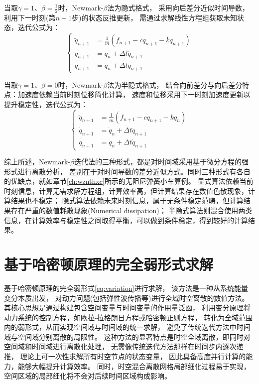 当取$\gamma=1$、$\beta=\frac{1}{2}$时，Newmark-$\beta$法为隐式格式，
采用向后差分近似时间导数，利用下一时刻(第$n+1$步)的状态反推更新，
需通过求解线性方程组获取未知状态，迭代公式为：
\begin{equation}\label{newmark-implicit}
    \left \{
        \begin{split}
            \ddot q_{n+1} &= \frac{1}{m}(f_{n+1} - c \dot q_{n+1} - k q_{n+1}) \\
            \dot q_{n+1} &= \dot q_n + \Delta t \ddot q_{n+1} \\
            q_{n+1} &= q_n + \Delta t \dot q_{n+1}
        \end{split}
    \right .
\end{equation}

当取$\gamma=1$、$\beta=0$时，Newmark-$\beta$法为半隐式格式，
结合向前差分与向后差分特点：加速度依赖当前时刻位移简化计算，
速度和位移采用下一时刻加速度更新以提升稳定性，迭代公式为：
\begin{equation}\label{newmark-semi-implicit}
    \left \{
        \begin{split}
            \ddot q_{n+1} &= \frac{1}{m}(f_{n+1} - c \dot q_{n+1} - k q_n) \\
            \dot q_{n+1} &= \dot q_n + \Delta t \ddot q_{n+1} \\
            q_{n+1} &= q_n + \Delta t \dot q_{n+1}
        \end{split}
    \right .
\end{equation}

综上所述，Newmark-$\beta$迭代法的三种形式，都是对时间域采用基于微分方程的强形式进行离散分析，
差别在于对时间导数的差分近似方式。同时三种形式有各自的优缺点，就如章节\ref{ch:wznthxc}所示的无阻尼弹簧小车算例。
显式算法依赖当前时刻信息，计算无需求解方程组，计算效率高，但计算结果存在数值色散现象，计算结果也不稳定；
隐式算法依赖未来时刻信息，属于无条件稳定范畴，但计算结果存在严重的数值耗散现象(Numerical dissipation)；
半隐式算法则混合使用两类信息，在计算效率与稳定性之间取得平衡，可以做到条件稳定，得到较好的计算结果。










\section{基于哈密顿原理的完全弱形式求解}

基于哈密顿原理的完全弱形式\eqref{eq:variation}进行求解，
该方法是一种从系统能量变分本质出发，
对动力问题(包括弹性波传播等)进行全域时空离散的数值方法。
其核心思想是通过构建包含空间变量与时间变量的作用量泛函，
利用变分原理将动力系统的控制方程，如欧拉-拉格朗日方程或哈密顿正则方程，
转化为全域范围内的弱形式，从而实现空间域与时间域的统一求解，
避免了传统迭代方法中时间域与空间域分别离散的局限性。
这种方法的显著特点是时空全域离散，即同时对空间域和时间域进行离散化处理，
无需像传统迭代方法那样在时间步内逐次递推，
理论上可一次性求解所有时空节点的状态变量，
因此具备高度并行计算的能力，能够大幅提升计算效率。
同时，时空混合离散网格局部细化过程易于实现，
空间区域的局部细化将不会对后续时间区域构成影响。

